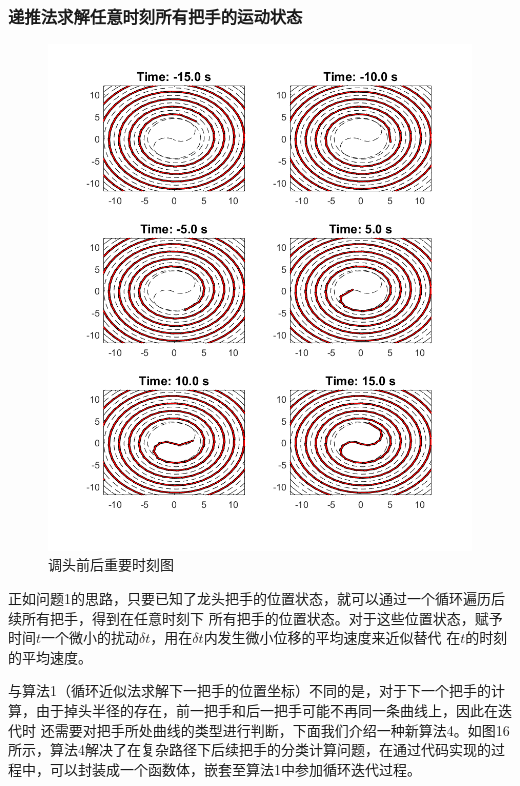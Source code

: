 \documentclass{cumcmthesis1}
\begin{document}
\subsubsection{递推法求解任意时刻所有把手的运动状态}
\begin{figure}[ht]
    \caption{调头前后重要时刻图}
    \centering    
    \includegraphics[width=0.79\linewidth]{drawing_5.4.4.2.png}
\end{figure}
正如问题1的思路，只要已知了龙头把手的位置状态，就可以通过一个循环遍历后续所有把手，得到在任意时刻下
所有把手的位置状态。对于这些位置状态，赋予时间$t$一个微小的扰动$\delta t$，用在$\delta t$内发生微小位移的平均速度来近似替代
在$t$的时刻的平均速度。
\par
与算法1（循环近似法求解下一把手的位置坐标）不同的是，对于下一个把手的计算，由于掉头半径的存在，前一把手和后一把手可能不再同一条曲线上，因此在迭代时
还需要对把手所处曲线的类型进行判断，下面我们介绍一种新算法4。如图16所示，算法4解决了在复杂路径下后续把手的分类计算问题，在通过代码实现的过程中，可以封装成一个函数体，嵌套至算法1中参加循环迭代过程。
\end{document}
